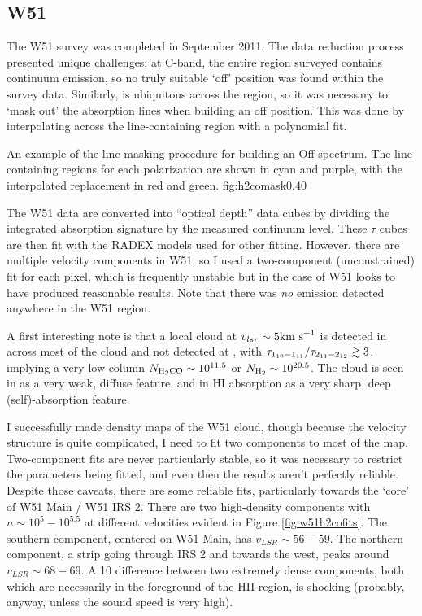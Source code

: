 \subsection{W51}
The W51 survey was completed in September 2011.  The data reduction process
presented unique challenges: at C-band, the entire region surveyed contains
continuum emission, so no truly suitable `off' position was found within the
survey data.  Similarly, \formaldehyde is ubiquitous across the region, so it
was necessary to `mask out' the absorption lines when building an off position.
This was done by interpolating across the line-containing region with a
polynomial fit.  

{An example of the \formaldehyde line masking procedure for building an Off
spectrum.  The line-containing regions for each polarization are shown in cyan
and purple, with the interpolated replacement in red and green.
}{fig:h2comask}{0.4}{0}

The W51 data are converted into ``optical depth'' data cubes by dividing the
integrated \formaldehyde absorption signature by the measured continuum level.
These $\tau$ cubes are then fit with the RADEX models used for other
\formaldehyde fitting.  However, there are multiple velocity components in W51,
so I used a two-component (unconstrained) fit for each pixel, which is
frequently unstable but in the case of W51 looks to have produced reasonable
results.  Note that there was \emph{no} \formaldehyde emission detected anywhere
in the W51 region.

A first interesting note is that a local cloud at $v_{lsr}\sim5 \textrm{km~s}^{-1}$ is
detected in \formaldehyde \oneone across most of the cloud and not detected at
\twotwo, with $\tau_{1_{10}-1_{11}}/\tau_{2_{11}-2_{12}} \gtrsim 3$, implying a
very low column
$N_{\textrm{H}_2\textrm{CO}}\sim10^{11.5}$ or $N_{\textrm{H}_{2}} \sim 10^{20.5}$.  
The cloud is seen in \thirteenco as a very weak, diffuse feature, and in HI absorption
as a very sharp, deep (self)-absorption feature.


I successfully made density maps of the W51 cloud, though because the velocity
structure is quite complicated, I need to fit two components to most of the
map.  Two-component fits are never particularly stable, so it was necessary to
restrict the parameters being fitted, and even then the results aren't
perfectly reliable.  Despite those caveats, there are some reliable fits,
particularly towards the `core' of W51 Main / W51 IRS 2.  There are two
high-density components with $n\sim10^5-10^5.5$ at different velocities evident
in Figure \ref{fig:w51h2cofits}.  The southern component, centered on W51 Main,
has $v_{LSR}\sim56-59$.  The northern component, a strip going through IRS 2
and towards the west, peaks around $v_{LSR}\sim68-69$.  A 10 \kms difference
between two extremely dense components, both which are necessarily in the
foreground of the HII region, is shocking (probably, anyway, unless the sound
speed is very high).


